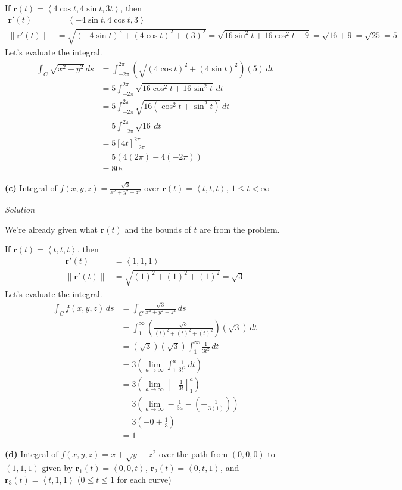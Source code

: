 \documentclass{article}
\newcommand{\lrp}[1]{\left( #1 \right)}
\newcommand{\lra}[1]{\left\langle #1 \right\rangle}
\newcommand{\lrb}[1]{\left[ #1 \right]}
\newcommand{\norm}[1]{\left\lVert #1 \right\rVert}
\renewcommand{\r}[0]{\mathbf{r}}
\newcommand{\Solution}{\textit{Solution}}
\begin{document}
If $\r(t)=\lra{4\cos t,4\sin t, 3t}$, then
\begin{align*}
    \r'(t)&=\lra{-4\sin t, 4\cos t, 3}\\
    \norm{\r'(t)}&=\sqrt{(-4\sin t)^2 +(4\cos t)^2 + (3)^2}=\sqrt{16\sin^2 t + 16\cos ^2 t + 9}=\sqrt{16 + 9}=\sqrt{25}=5
\end{align*}
Let's evaluate the integral.
\begin{align*}
    \int_{C}\sqrt{x^2+y^2}\,ds&=\int_{-2\pi}^{2\pi}\lrp{\sqrt{\lrp{4\cos t}^2+\lrp{4\sin t}^2}}\lrp{5}\,dt\\
    &=5\int_{-2\pi}^{2\pi}\sqrt{16\cos^2 t+16\sin^2 t}\,dt\tag{we can move constants outside}\\
    &=5\int_{-2\pi}^{2\pi} \sqrt{16(\cos^2 t + \sin^2 t)}\,dt\\
    &=5\int_{-2\pi}^{2\pi}\sqrt{16}\,dt\tag{$\cos ^2 t + \sin ^2 t = 1$}\\
    &=5\lrb{4t}_{-2\pi}^{2\pi}\\
    &=5\lrp{4(2\pi)-4(-2\pi)}\\
    &=\boxed{80\pi}
\end{align*}
\newpage
{}
{}\textbf{(c)} Integral of $\displaystyle f(x,y,z)=\frac{\sqrt{3}}{x^2+y^2+z^2}$ over $\r(t)=\lra{t,t,t}$, $1\leq t < \infty$

\Solution

We're already given what $\r(t)$ and the bounds of $t$ are from the problem. 

If $\r(t)=\lra{t,t,t}$, then
\begin{align*}
    \r'(t)&=\lra{1,1,1}\\
    \norm{\r'(t)}&=\sqrt{(1)^2+(1)^2+(1)^2}=\sqrt{3}
\end{align*}
Let's evaluate the integral.
\begin{align*}
    \int_C f(x,y,z)\,ds&=\int_C \frac{\sqrt{3}}{x^2+y^2+z^2}\,ds\\
    &=\int_1^{\infty}\lrp{\frac{\sqrt{3}}{(t)^2+(t)^2+(t)^2}}\lrp{\sqrt{3}}\,dt\\
    &=\lrp{\sqrt{3}}\lrp{\sqrt{3}}\int_1^{\infty}\frac{1}{3t^2}\,dt\tag{we can move constants outside}\\
    &=3\lrp{\lim_{a\to\infty}\int_1^a\frac{1}{3t^2}\,dt}\\
    &=3\lrp{\lim_{a\to\infty}\lrb{-\frac{1}{3t}}_1^a}\\
    &=3\lrp{\lim_{a\to\infty}-\frac{1}{3a}-\lrp{-\frac{1}{3(1)}}}\\
    &=3\lrp{-0+\frac{1}{3}}\\
    &=\boxed{1}
\end{align*}
{}\textbf{(d)} Integral of $\displaystyle f(x,y,z)=x+\sqrt{y}+z^2$ over the path from $(0,0,0)$ to $(1,1,1)$ given by $\r_1(t)=\lra{0,0,t}$, $\r_2(t)=\lra{0,t,1}$, and $\r_3(t)=\lra{t,1,1}$ ($0\leq t\leq 1$ for each curve)
\end{document}
